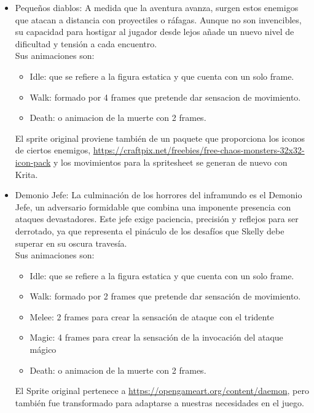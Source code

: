 \documentclass[12pt,a4paper,twoside,spanish]{article}      %
\begin{document}
\begin{itemize}
    \item Pequeños diablos: A medida que la aventura avanza, surgen estos enemigos que atacan a distancia con proyectiles o ráfagas. Aunque no son invencibles, su capacidad para hostigar al jugador desde lejos añade un nuevo nivel de dificultad y tensión a cada encuentro.\\
    Sus animaciones  son: 
    \begin{itemize}
        \item Idle: que se refiere a la figura estatica y que cuenta con un solo frame.
        \item Walk: formado por 4 frames que pretende dar sensacion de movimiento.
        \item Death: o animacion de la muerte con 2 frames.
    \end{itemize}
    El sprite original proviene también de un paquete que proporciona los iconos de ciertos enemigos, \url{https://craftpix.net/freebies/free-chaos-monsters-32x32-icon-pack} y los movimientos para la spritesheet se generan de nuevo con Krita.

    \begin{center}
    \end{center}

    \item Demonio Jefe: La culminación de los horrores del inframundo es el Demonio Jefe, un adversario formidable que combina una imponente presencia con ataques devastadores. Este jefe exige paciencia, precisión y reflejos para ser derrotado, ya que representa el pináculo de los desafíos que Skelly debe superar en su oscura travesía.\\
    Sus animaciones son:
    \begin{itemize}
        \item Idle: que se refiere a la figura estatica y que cuenta con un solo frame.
        \item Walk: formado por 2 frames que pretende dar sensación de movimiento.
        \item Melee: 2 frames para crear la sensación de ataque con el tridente
        \item Magic: 4 frames para crear la sensación de la invocación del ataque mágico
        \item Death: o animacion de la muerte con 2 frames.
    \end{itemize}
    El Sprite original pertenece a \url{https://opengameart.org/content/daemon}, pero también fue transformado para adaptarse a nuestras necesidades en el juego.

    \begin{center}
    \end{center}
\end{itemize}
\end{document}
